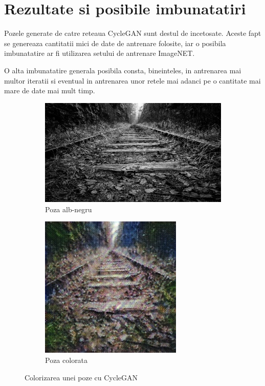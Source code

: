 \documentclass[12pt]{article}
\theoremstyle{definition}
\begin{document}
\section{Rezultate si posibile imbunatatiri}

Pozele generate de catre reteaua CycleGAN sunt destul de incetosate.
Aceste fapt se genereaza cantitatii mici de date de antrenare folosite, iar o posibila imbunatatire ar fi utilizarea setului de antrenare ImageNET.

O alta imbunatatire generala posibila consta, bineinteles, in antrenarea mai multor iteratii si eventual in antrenarea unor retele mai adanci pe o cantitate mai mare de date mai mult timp.

\begin{figure}[H]
	\centering
	\begin{subfigure}{0.4\textwidth}
		\includegraphics[width=\linewidth]{input_sample.jpg}
		\caption{Poza alb-negru}
	\end{subfigure}
	\vspace{1em}
	\begin{subfigure}{0.4\textwidth}
		\includegraphics[width=\textwidth]{output_sample.jpg}
		\caption{Poza colorata}
	\end{subfigure}
	\caption{Colorizarea unei poze cu CycleGAN}
\end{figure}
\end{document}
